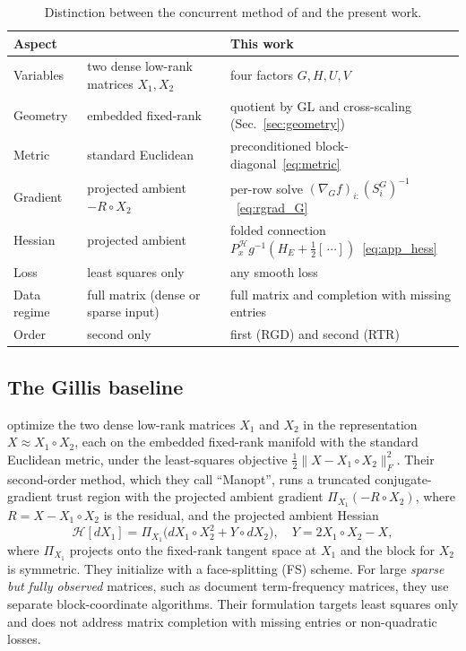 \documentclass[letterpaper, 10 pt, conference]{ieeeconf}
\newcommand{\cH}{\mathcal{H}}
\newcommand{\Had}{\circ}
\theoremstyle{plain}
\theoremstyle{definition}
\theoremstyle{remark}
\begin{document}
\begin{table}[t]
\centering
\small
\caption{Distinction between the concurrent method of \citet{gillis2026manifold} and the present work.}
\label{tab:gillis_distinction}
\begin{tabular}{@{}lll@{}}
\toprule
Aspect & \citet{gillis2026manifold} & This work \\
\midrule
Variables    & two dense low-rank matrices $X_1,X_2$ & four factors $G,H,U,V$ \\
Geometry     & embedded fixed-rank & quotient by GL and cross-scaling (Sec.~\ref{sec:geometry}) \\
Metric       & standard Euclidean & preconditioned block-diagonal~\eqref{eq:metric} \\
Gradient     & projected ambient $-R\Had X_2$ & per-row solve $(\nabla_G f)_{i:}(S_i^G)^{-1}$~\eqref{eq:rgrad_G} \\
Hessian      & projected ambient & folded connection $P_x^{\cH}g^{-1}(H_E+\tfrac12[\,\cdots])$~\eqref{eq:app_hess} \\
Loss         & least squares only & any smooth loss \\
Data regime  & full matrix (dense or sparse input) & full matrix and completion with missing entries \\
Order        & second only & first (RGD) and second (RTR) \\
\bottomrule
\end{tabular}
\end{table}





\subsection{The Gillis baseline}
\citet{gillis2026manifold} optimize the two dense low-rank matrices $X_1$ and $X_2$ in the representation $X\approx X_1\Had X_2$, each on the embedded fixed-rank manifold with the standard Euclidean metric, under the least-squares objective $\tfrac12\|X-X_1\Had X_2\|_F^2$. Their second-order method, which they call ``Manopt'', runs a truncated conjugate-gradient trust region with the projected ambient gradient $\Pi_{X_1}({-}R\Had X_2)$, where $R=X-X_1\Had X_2$ is the residual, and the projected ambient Hessian
\begin{equation*}
  \mathcal{H}[dX_1] = \Pi_{X_1}\!\big(dX_1\Had X_2^2 + Y\Had dX_2\big), \quad Y = 2X_1\Had X_2 - X,
\end{equation*}
where $\Pi_{X_1}$ projects onto the fixed-rank tangent space at $X_1$ and the block for $X_2$ is symmetric. They initialize with a face-splitting (FS) scheme. For large \emph{sparse but fully observed} matrices, such as document term-frequency matrices, they use separate block-coordinate algorithms. Their formulation targets least squares only and does not address matrix completion with missing entries or non-quadratic losses.
\end{document}
